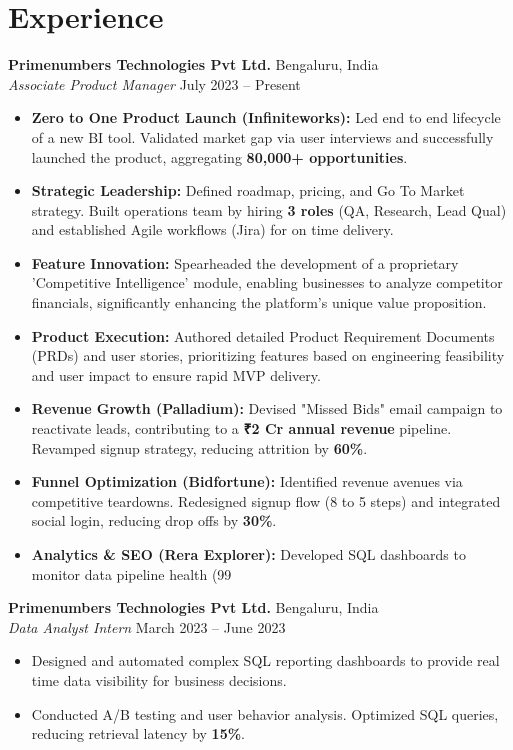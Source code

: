 \documentclass[a4paper,10pt]{article}
\begin{document}
\section{Experience}
\noindent \textbf{Primenumbers Technologies Pvt Ltd.} \hfill Bengaluru, India \\
\textit{Associate Product Manager} \hfill July 2023 -- Present
\begin{itemize}[noitemsep,topsep=3pt,leftmargin=*]
    \item \textbf{Zero to One Product Launch (Infiniteworks):} Led end to end lifecycle of a new BI tool. Validated market gap via user interviews and successfully launched the product, aggregating \textbf{80,000+ opportunities}.
    \item \textbf{Strategic Leadership:} Defined roadmap, pricing, and Go To Market strategy. Built operations team by hiring \textbf{3 roles} (QA, Research, Lead Qual) and established Agile workflows (Jira) for on time delivery.
    \item \textbf{Feature Innovation:} Spearheaded the development of a proprietary 'Competitive Intelligence' module, enabling businesses to analyze competitor financials, significantly enhancing the platform's unique value proposition.
    \item \textbf{Product Execution:} Authored detailed Product Requirement Documents (PRDs) and user stories, prioritizing features based on engineering feasibility and user impact to ensure rapid MVP delivery.
    \item \textbf{Revenue Growth (Palladium):} Devised "Missed Bids" email campaign to reactivate leads, contributing to a \textbf{₹2 Cr annual revenue} pipeline. Revamped signup strategy, reducing attrition by \textbf{60\%}.
    \item \textbf{Funnel Optimization (Bidfortune):} Identified revenue avenues via competitive teardowns. Redesigned signup flow (8 to 5 steps) and integrated social login, reducing drop offs by \textbf{30\%}.
    \item \textbf{Analytics \& SEO (Rera Explorer):} Developed SQL dashboards to monitor data pipeline health (99%
\end{itemize}
\vspace{6pt}
\noindent \textbf{Primenumbers Technologies Pvt Ltd.} \hfill Bengaluru, India \\
\textit{Data Analyst Intern} \hfill March 2023 -- June 2023
\begin{itemize}[noitemsep,topsep=0pt,leftmargin=*]
    \item Designed and automated complex SQL reporting dashboards to provide real time data visibility for business decisions.
    \item Conducted A/B testing and user behavior analysis. Optimized SQL queries, reducing retrieval latency by \textbf{15\%}.
\end{itemize}
\end{document}
